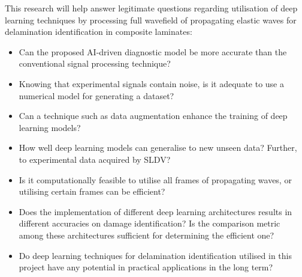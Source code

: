 This research will help answer legitimate questions regarding utilisation of deep learning techniques by processing full wavefield of propagating elastic waves for delamination identification in composite laminates:
\begin{itemize}
	\item Can the proposed AI-driven diagnostic model be more accurate than the conventional signal processing technique?
	\item Knowing that experimental signals contain noise, is it adequate to use a numerical model for generating a dataset?
	\item Can a technique such as data augmentation enhance the training of deep learning models?
	\item How well deep learning models can generalise to new unseen data? Further, to experimental data acquired by SLDV?
	\item Is it computationally feasible to utilise all frames of propagating waves, or utilising certain frames can be efficient?
	\item Does the implementation of different deep learning architectures results in different accuracies on damage identification? Is the comparison metric among these architectures sufficient for determining the efficient one?
	\item Do deep learning techniques for delamination identification utilised in this project have any potential in practical applications in the long term?
\end{itemize}
